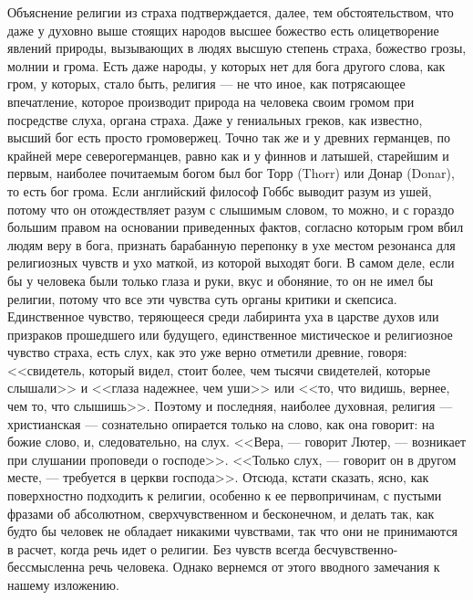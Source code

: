 \documentclass[12pt]{article}
\begin{document}
Объяснение религии из страха подтверждается, далее, тем обстоятельством, что даже у духовно выше стоящих народов высшее божество есть олицетворение явлений природы, вызывающих в людях высшую степень страха, божество грозы, молнии и грома. Есть даже народы, у которых нет для бога другого слова, как гром, у которых, стало быть, религия --- не что иное, как потрясающее впечатление, которое производит природа на человека своим громом при посредстве слуха, органа страха. Даже у гениальных греков, как известно, высший бог есть просто громовержец. Точно так же и у древних германцев, по крайней мере северогерманцев, равно как и у финнов и латышей, старейшим и первым, наиболее почитаемым богом был бог Торр (Thorr) или Донар (Donar), то есть бог грома. Если английский философ Гоббс выводит разум из ушей, потому что он отождествляет разум с слышимым словом, то можно, и с гораздо большим правом на основании приведенных фактов, согласно которым гром вбил людям веру в бога, признать барабанную перепонку в ухе местом резонанса для религиозных чувств и ухо маткой, из которой выходят боги. В самом деле, если бы у человека были только глаза и руки, вкус и обоняние, то он не имел бы религии, потому что все эти чувства суть органы критики и скепсиса. Единственное чувство, теряющееся среди лабиринта уха в царстве духов или призраков прошедшего или будущего, единственное мистическое и религиозное чувство страха, есть слух, как это уже верно отметили древние, говоря: <<свидетель, который видел, стоит более, чем тысячи свидетелей, которые слышали>>  и <<глаза надежнее, чем уши>>  или <<то, что видишь, вернее, чем то, что слышишь>>. Поэтому и последняя, наиболее духовная, религия --- христианская --- сознательно опирается только на слово, как она говорит: на божие слово, и, следовательно, на слух. <<Вера, --- говорит Лютер, --- возникает при слушании проповеди о господе>>. <<Только слух, --- говорит он в другом месте, --- требуется в церкви господа>>. Отсюда, кстати сказать, ясно, как поверхностно подходить к религии, особенно к ее первопричинам, с пустыми фразами об абсолютном, сверхчувственном и бесконечном, и делать так, как будто бы человек не обладает никакими чувствами, так что они не принимаются в расчет, когда речь идет о религии. Без чувств всегда бесчувственно-бессмысленна речь человека. Однако вернемся от этого вводного замечания к нашему изложению. 
\end{document}

